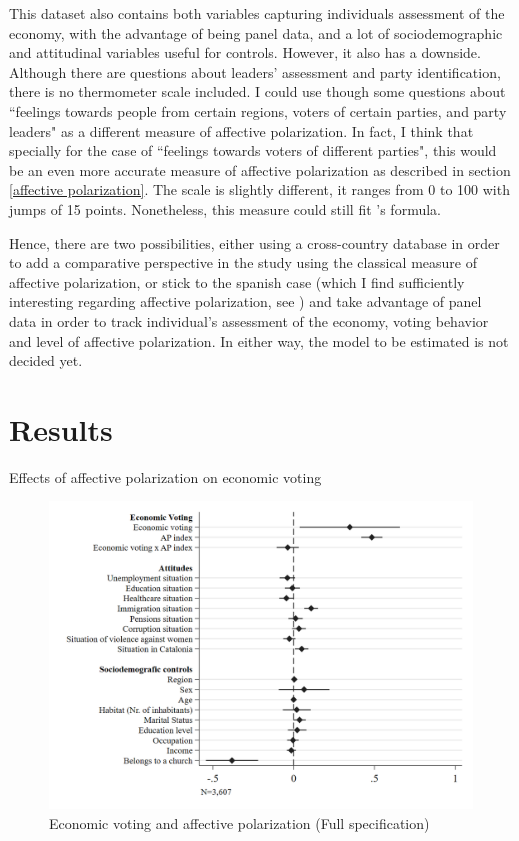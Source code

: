\documentclass[a4paper, svgnames]{article}
\begin{document}
This dataset also contains both variables capturing individuals assessment of the economy, with the advantage of being panel data, and a lot of sociodemographic and attitudinal variables useful for controls. However, it also has a downside. Although there are questions about leaders' assessment and party identification, there is no thermometer scale included. I could use though some questions about ``feelings towards people from certain regions, voters of certain parties, and party leaders" as a different measure of affective polarization. In fact, I think that specially for the case of ``feelings towards voters of different parties", this would be an even more accurate measure of affective polarization as described in section \ref{affective polarization}. The scale is slightly different, it ranges from 0 to 100 with jumps of 15 points. Nonetheless, this measure could still fit \cite{Wagner2021}'s formula.


Hence, there are two possibilities, either using a cross-country database in order to add a comparative perspective in the study using the classical measure of affective polarization, or stick to the spanish case (which I find sufficiently interesting regarding affective polarization, see \cite{Orriols2020}) and take advantage of panel data in order to track individual's assessment of the economy, voting behavior and level of affective polarization. In either way, the model to be estimated is not decided yet.

\section{Results}
\begin{table}[H]
\centering
\caption{Effects of affective polarization on economic voting}

\end{table}

\begin{figure}[H]
\centering
\includegraphics[scale=0.35]{Figures/model_3_coefplot.png}
\caption{Economic voting and affective polarization (Full specification)}
\end{figure}
\end{document}
